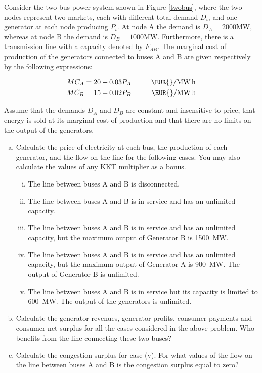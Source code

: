 \documentclass[11pt,a4paper,fleqn]{scrartcl}
\newcommand{\eur}{\text{\EUR{}}}
\begin{document}
Consider the two-bus power system shown in Figure \ref{twobus}, where the two nodes represent two markets, each with different total demand $D_i$, and one generator at each node producing $P_i$. At node A the demand is $D_A = 2000 \si{\mega\watt}$, whereas at node B the demand is $D_B = 1000 \si{\mega\watt}$. Furthermore, there is a transmission line with a capacity denoted by $F_{AB}$. The marginal cost of production of the generators connected to buses A and B are given respectively by the following expressions:

\begin{align*}
 MC_A & = 20 + 0.03 P_A \hspace{1cm}\eur/\si{\mega\watt\hour}  \\
 MC_B & = 15 + 0.02 P_B \hspace{1cm} \eur/\si{\mega\watt\hour}
\end{align*}

Assume that the demands $D_A$ and $D_B$ are constant and insensitive to price, that energy is sold at its marginal cost of production and that there are no limits on the output of the generators.

\begin{enumerate}[(a)]
 \item Calculate the price of electricity at each bus, the production
       of each generator, and the flow on the line for the following cases. You may also calculate the values of any KKT multiplier as a bonus.
       \begin{enumerate}[(i)]
        \item The line between buses A and B is disconnected.
        \item The line between buses A and B is in service and has an unlimited capacity.
        \item The line between buses A and B is in service and has an unlimited capacity, but the maximum output of Generator B is 1500~MW.
        \item The   line between buses A and B is in service and has an unlimited capacity, but the maximum output of Generator A is 900~MW. The output of Generator B is unlimited.
        \item The line between buses A and B is in service but its capacity is limited to 600~MW. The output of the generators is unlimited.
       \end{enumerate}
 \item Calculate the generator revenues, generator profits, consumer payments and consumer net surplus for all the cases considered in the above problem. Who benefits from the line connecting these two buses?
 \item Calculate the congestion surplus for case (v). For what values of the flow on the line between buses A and B is the congestion surplus equal to zero?
\end{enumerate}
\end{document}
